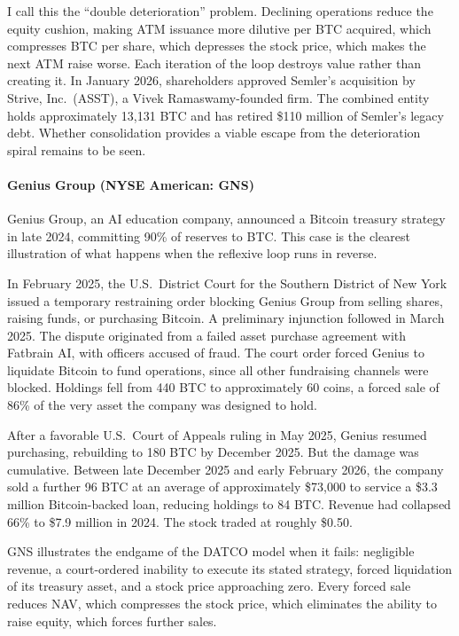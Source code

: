 I call this the ``double deterioration'' problem. Declining operations reduce the equity cushion, making ATM issuance more dilutive per BTC acquired, which compresses BTC per share, which depresses the stock price, which makes the next ATM raise worse. Each iteration of the loop destroys value rather than creating it. In January 2026, shareholders approved Semler's acquisition by Strive, Inc.\ (ASST), a Vivek Ramaswamy-founded firm. The combined entity holds approximately 13,131 BTC and has retired \$110 million of Semler's legacy debt. Whether consolidation provides a viable escape from the deterioration spiral remains to be seen.

\paragraph{Genius Group (NYSE American: GNS)}

Genius Group, an AI education company, announced a Bitcoin treasury strategy in late 2024, committing 90\% of reserves to BTC. This case is the clearest illustration of what happens when the reflexive loop runs in reverse.

In February 2025, the U.S.\ District Court for the Southern District of New York issued a temporary restraining order blocking Genius Group from selling shares, raising funds, or purchasing Bitcoin. A preliminary injunction followed in March 2025. The dispute originated from a failed asset purchase agreement with Fatbrain AI, with officers accused of fraud. The court order forced Genius to liquidate Bitcoin to fund operations, since all other fundraising channels were blocked. Holdings fell from 440 BTC to approximately 60 coins, a forced sale of 86\% of the very asset the company was designed to hold.

After a favorable U.S.\ Court of Appeals ruling in May 2025, Genius resumed purchasing, rebuilding to 180 BTC by December 2025. But the damage was cumulative. Between late December 2025 and early February 2026, the company sold a further 96 BTC at an average of approximately \$73,000 to service a \$3.3 million Bitcoin-backed loan, reducing holdings to 84 BTC. Revenue had collapsed 66\% to \$7.9 million in 2024. The stock traded at roughly \$0.50.

GNS illustrates the endgame of the DATCO model when it fails: negligible revenue, a court-ordered inability to execute its stated strategy, forced liquidation of its treasury asset, and a stock price approaching zero. Every forced sale reduces NAV, which compresses the stock price, which eliminates the ability to raise equity, which forces further sales.


